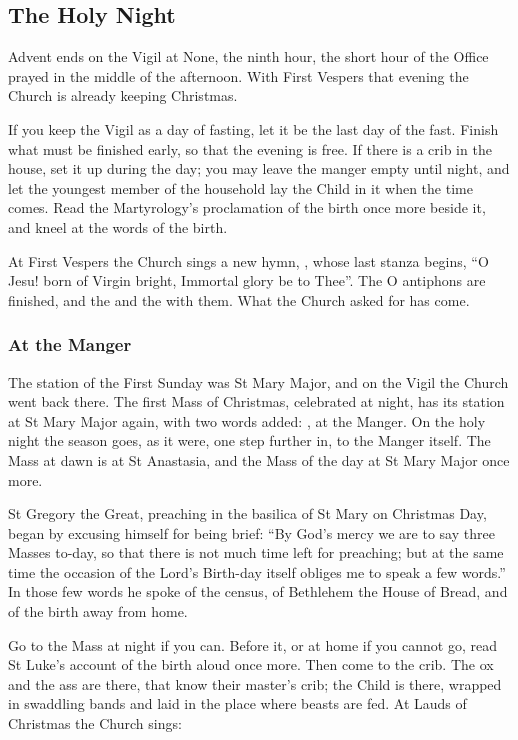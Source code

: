 \subsection{The Holy Night}\label{sec:holy-night}

Advent ends on the Vigil at None, the ninth hour, the short hour of the Office
prayed in the middle of the afternoon. With First Vespers that evening the
Church is already keeping Christmas.

If you keep the Vigil as a day of fasting, let it be the last day of the fast.
Finish what must be finished early, so that the evening is free. If there is a
crib in the house, set it up during the day; you may leave the manger empty
until night, and let the youngest member of the household lay the Child in it
when the time comes. Read the Martyrology's proclamation of the birth once more
beside it, and kneel at the words of the birth.

At First Vespers the Church sings a new hymn, ,
whose last stanza begins, ``O Jesu! born of Virgin bright, Immortal glory be
to Thee''. The O antiphons are finished, and the  and the
 with them. What the Church asked for has come.

\subsubsection*{At the Manger}

The station of the First Sunday was St Mary Major, and on the Vigil the Church
went back there. The first Mass of Christmas, celebrated at night, has its
station at St Mary Major again, with two words added: , at
the Manger. On the holy night the season goes, as it were, one step further in,
to the Manger itself. The Mass at dawn is at St Anastasia, and the Mass of the
day at St Mary Major once more.

St Gregory the Great, preaching in the basilica of St Mary on Christmas Day, began by
excusing himself for being brief: ``By God's mercy we are to say three Masses
to-day, so that there is not much time left for preaching; but at the same time
the occasion of the Lord's Birth-day itself obliges me to speak a few words.''
In those few words he spoke of the census, of Bethlehem the House of Bread, and
of the birth away from home.

Go to the Mass at night if you can. Before it, or at home if you cannot go,
read St Luke's account of the birth aloud once more. Then come to the crib. The
ox and the ass are there, that know their master's crib; the Child is there,
wrapped in swaddling bands and laid in the place where beasts are fed. At
Lauds of Christmas the Church sings:

